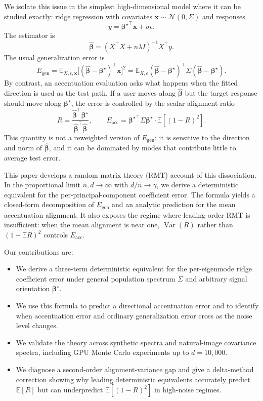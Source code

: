 \documentclass{article}
\newcommand{\bhat}{\widehat{\boldsymbol{\beta}}}
\newcommand{\btrue}{\boldsymbol{\beta}^{\star}}
\newcommand{\x}{\mathbf{x}}
\newcommand{\Eacc}{E_{\mathrm{acc}}}
\begin{document}
We isolate this issue in the simplest high-dimensional model where it can be studied exactly: ridge regression with covariates $\x\sim\mathcal{N}(0,\Sigma)$ and responses
\begin{equation}
    y = {\btrue}^{\top} \x + \sigma \epsilon .
\end{equation}
The estimator is
\begin{equation}
    \bhat = (X^\top X + n\lambda I)^{-1}X^\top y.
\end{equation}
The usual generalization error is
\begin{equation}
    E_{\mathrm{gen}} = \mathbb{E}_{X,\epsilon,\x}\bigl[(\bhat-\btrue)^\top \x\bigr]^2
    = \mathbb{E}_{X,\epsilon}(\bhat-\btrue)^\top\Sigma(\bhat-\btrue).
\end{equation}
By contrast, an accentuation evaluation asks what happens when the fitted direction is used as the test path. If a user moves along $\bhat$ but the target response should move along $\btrue$, the error is controlled by the scalar alignment ratio
\begin{equation}
    R=\frac{\bhat^\top\btrue}{\bhat^\top\bhat},
    \qquad
    \Eacc = {\btrue}^{\top}\Sigma\btrue \cdot \mathbb{E}\left[(1-R)^2\right].
\end{equation}
This quantity is not a reweighted version of $E_{\mathrm{gen}}$: it is sensitive to the direction and norm of $\bhat$, and it can be dominated by modes that contribute little to average test error.

This paper develops a random matrix theory (RMT) account of this dissociation. In the proportional limit $n,d\to\infty$ with $d/n\to\gamma$, we derive a deterministic equivalent for the per-principal-component coefficient error. The formula yields a closed-form decomposition of $E_{\mathrm{gen}}$ and an analytic prediction for the mean accentuation alignment. It also exposes the regime where leading-order RMT is insufficient: when the mean alignment is near one, $\operatorname{Var}(R)$ rather than $(1-\mathbb{E}R)^2$ controls $\Eacc$.

Our contributions are:
\begin{itemize}
    \item We derive a three-term deterministic equivalent for the per-eigenmode ridge coefficient error under general population spectrum $\Sigma$ and arbitrary signal orientation $\btrue$.
    \item We use this formula to predict a directional accentuation error and to identify when accentuation error and ordinary generalization error cross as the noise level changes.
    \item We validate the theory across synthetic spectra and natural-image covariance spectra, including GPU Monte Carlo experiments up to $d=10{,}000$.
    \item We diagnose a second-order alignment-variance gap and give a delta-method correction showing why leading deterministic equivalents accurately predict $\mathbb{E}[R]$ but can underpredict $\mathbb{E}[(1-R)^2]$ in high-noise regimes.
\end{itemize}
\end{document}
